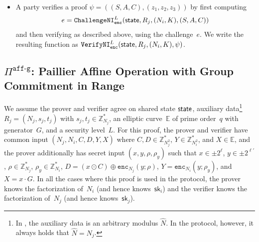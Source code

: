 \documentclass[11pt]{article}
\def\state{{\sf state}}
\newcommand{\enc}{\ensuremath{\mathtt{enc}}}
\newcommand{\sid}{\ensuremath{\mathtt{sid}}}
\newcommand{\proof}[1]{\ensuremath{\Pi^{\mathtt{#1}}}}
\newcommand{\challengeni}[1]{\ensuremath{\mathtt{ChallengeNI}_{\mathtt{#1}}}}
\newcommand{\prove}[1]{\ensuremath{\mathtt{Prove}_{\mathtt{#1}}}}
\newcommand{\verify}[1]{\ensuremath{\mathtt{Verify}_{\mathtt{#1}}}}
\newcommand{\verifyni}[1]{\ensuremath{\mathtt{VerifyNI}_{\mathtt{#1}}}}
\newcommand{\sk}{\textsf{sk}}
\newcommand{\E}{\mathbb{E}}
\newcommand{\Z}{\mathbb{Z}}
\newcommand{\?}[1]{\stackrel{?}{#1}}
\begin{document}
\begin{itemize}





    \item A party verifies a proof $\psi=((S, A, C), (z_1, z_2, z_3))$ by first computing \[e = \challengeni{enc}^{L}(\state, R_j, (N_i, K), (S, A, C))\] and then verifying as described above, using the challenge~$e$. We write the resulting function as $\verifyni{enc}^{L}(\state, R_j, (N_i, K), \psi)$.
    


\end{itemize}

\subsection{\proof{aff\mbox{-}g}: Paillier Affine Operation with Group Commitment in Range}


We assume the prover and verifier agree on shared state $\state$, auxiliary data\footnote{In \cite{cggmp21}, the auxiliary data is an arbitrary modulus $\hat N$. In the protocol, however, it always holds that $\hat N=N_j$.} $R_j = (N_j, s_j, t_j)$ with $s_j, t_j \in \Z^*_{N_j}$,
an elliptic curve~$\E$ of prime order~$q$ with generator~$G$,
and a security level~$L$.
For this proof, the prover and verifier have common input 
$(N_j, N_i, C, D, Y, X)$ 
where $C, D \in \Z^*_{N_j^2}$, 
$Y \in \Z^*_{N_i^2}$, and
$X \in \E$, and the prover additionally has secret input 
$(x, y, \rho, \rho_y)$ such that 
$x \in \pm 2^\ell$, 
$y \in \pm 2^{\ell'}$, 
$\rho \in \Z^*_{N_j}$, 
$\rho_y \in \Z^*_{N_i}$,  
$D = (x \odot C) \oplus \enc_{N_j}(y; \rho)$, 
$Y = \enc_{N_i}(y; \rho_y)$,
and $X = x \cdot G$.
In all the cases where this proof is used in the protocol, the prover knows the factorization of~$N_i$ (and hence knows~$\sk_i$) and the verifier knows the factorization of~$N_j$ (and hence knows~$\sk_j$).
\end{document}
